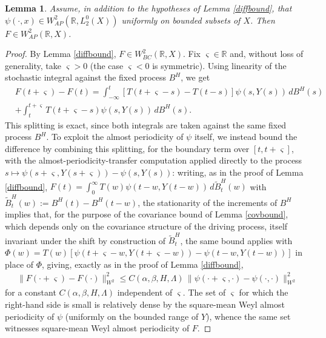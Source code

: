 \documentclass[11pt]{amsart}
\newtheorem{lemma}[theorem]{Lemma}
\begin{document}
\begin{lemma}\label{diffAP}
Assume, in addition to the hypotheses of Lemma \ref{diffbound}, that $\psi(\cdot,x)\in W^2_{AP}(\mathbb R,L^0_2(X))$ uniformly on bounded subsets of $X$. Then $F\in W^2_{AP}(\mathbb R,X)$.
\end{lemma}

\begin{proof}
By Lemma \ref{diffbound}, $F\in W^2_{BC}(\mathbb R,X)$. Fix $\varsigma\in\mathbb R$ and, without loss of generality, take $\varsigma>0$ (the case $\varsigma<0$ is symmetric). Using linearity of the stochastic integral against the fixed process $B^H$, we get
\begin{align*}
&F(t+\varsigma)-F(t)=\int_{-\infty}^t[T(t+\varsigma-s)-T(t-s)]\psi(s,Y(s))\,dB^H(s)\\
&+\int_t^{t+\varsigma}T(t+\varsigma-s)\psi(s,Y(s))\,dB^H(s).
\end{align*}
This splitting is exact, since both integrals are taken against the same fixed process $B^H$. To exploit the almost periodicity of $\psi$ itself, we instead bound the difference by combining this splitting, for the boundary term over $[t,t+\varsigma]$, with the almost-periodicity-transfer computation applied directly to the process $s\mapsto\psi(s+\varsigma,Y(s+\varsigma))-\psi(s,Y(s))$: writing, as in the proof of Lemma \ref{diffbound}, $F(t)=\int_0^\infty T(w)\psi(t-w,Y(t-w))\,d\widetilde B^H_t(w)$ with $\widetilde B^H_t(w):=B^H(t)-B^H(t-w)$, the stationarity of the increments of $B^H$ implies that, for the purpose of the covariance bound of Lemma \ref{covbound}, which depends only on the covariance structure of the driving process, itself invariant under the shift by construction of $\widetilde B^H_t$, the same bound applies with $\Phi(w)=T(w)[\psi(t+\varsigma-w,Y(t+\varsigma-w))-\psi(t-w,Y(t-w))]$ in place of $\Phi$, giving, exactly as in the proof of Lemma \ref{diffbound},
\begin{align*}
\|F(\cdot+\varsigma)-F(\cdot)\|^2_{W^2}\le C(\alpha,\beta,H,\Lambda)\,\|\psi(\cdot+\varsigma,\cdot)-\psi(\cdot,\cdot)\|^2_{W^2}
\end{align*}
for a constant $C(\alpha,\beta,H,\Lambda)$ independent of $\varsigma$. The set of $\varsigma$ for which the right-hand side is small is relatively dense by the square-mean Weyl almost periodicity of $\psi$ (uniformly on the bounded range of $Y$), whence the same set witnesses square-mean Weyl almost periodicity of $F$.
\end{proof}
\end{document}
